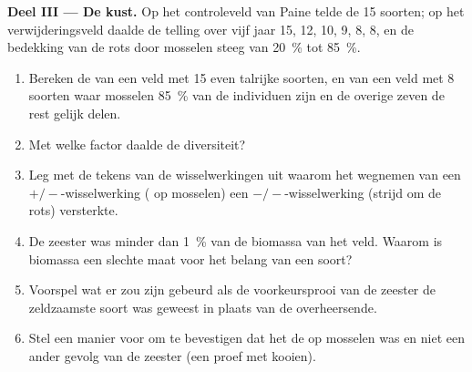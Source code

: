 \begin{problem}
\medskip
\noindent\textbf{Deel III --- De kust.}
Op het controleveld van Paine telde de  15 soorten; op het
verwijderingsveld daalde de telling over vijf jaar 15, 12, 10, 9, 8, 8, en
de bedekking van de rots door mosselen steeg van \qty{20}{\%} tot \qty{85}{\%}.
\begin{enumerate}[resume]
  \item Bereken de  van een veld met 15 even talrijke
        soorten, en van een veld met 8 soorten waar mosselen \qty{85}{\%}
        van de individuen zijn en de overige zeven de rest gelijk delen.
  \item Met welke factor daalde de diversiteit?
  \item Leg met de tekens van de wisselwerkingen uit waarom het wegnemen
        van een $+/-$-wisselwerking ( op mosselen) een
        $-/-$-wisselwerking (strijd om de rots) versterkte.
  \item De zeester was minder dan \qty{1}{\%} van de biomassa van het
        veld. Waarom is biomassa een slechte maat voor het belang van een
        soort?
  \item Voorspel wat er zou zijn gebeurd als de voorkeursprooi van de
        zeester de zeldzaamste soort was geweest in plaats van de
        overheersende.
  \item Stel een manier voor om te bevestigen dat het de  op
        mosselen was en niet een ander gevolg van de zeester (een proef
        met kooien).
\end{enumerate}


\end{problem}
